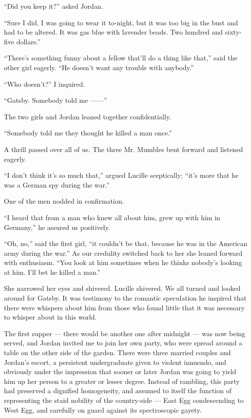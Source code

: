 \documentclass{znotebook}
\begin{document}
``Did you keep it?'' asked Jordan.

``Sure I did. I was going to wear it to-night, but it was too big in the bust and had to be altered. It was gas blue with lavender beads. Two hundred and sixty-five dollars.''

``There’s something funny about a fellow that’ll do a thing like that,'' said the other girl eagerly. ``He doesn’t want any trouble with anybody.''

``Who doesn’t?'' I inquired.

``Gatsby. Somebody told me ——''

The two girls and Jordan leaned together confidentially.

``Somebody told me they thought he killed a man once.''

A thrill passed over all of us. The three Mr. Mumbles bent forward and listened eagerly.

``I don’t think it’s so much that,'' argued Lucille sceptically; ``it’s more that he was a German spy during the war.''

One of the men nodded in confirmation.

``I heard that from a man who knew all about him, grew up with him in Germany,'' he assured us positively.

``Oh, no,'' said the first girl, ``it couldn’t be that, because he was in the American army during the war.'' As our credulity switched back to her she leaned forward with enthusiasm. ``You look at him sometimes when he thinks nobody’s looking at him. I’ll bet he killed a man.''

She narrowed her eyes and shivered. Lucille shivered. We all turned and looked around for Gatsby. It was testimony to the romantic speculation he inspired that there were whispers about him from those who found little that it was necessary to whisper about in this world.

The first supper — there would be another one after midnight — was now being served, and Jordan invited me to join her own party, who were spread around a table on the other side of the garden. There were three married couples and Jordan’s escort, a persistent undergraduate given to violent innuendo, and obviously under the impression that sooner or later Jordan was going to yield him up her person to a greater or lesser degree. Instead of rambling, this party had preserved a dignified homogeneity, and assumed to itself the function of representing the staid nobility of the country-side — East Egg condescending to West Egg, and carefully on guard against its spectroscopic gayety.
\end{document}
